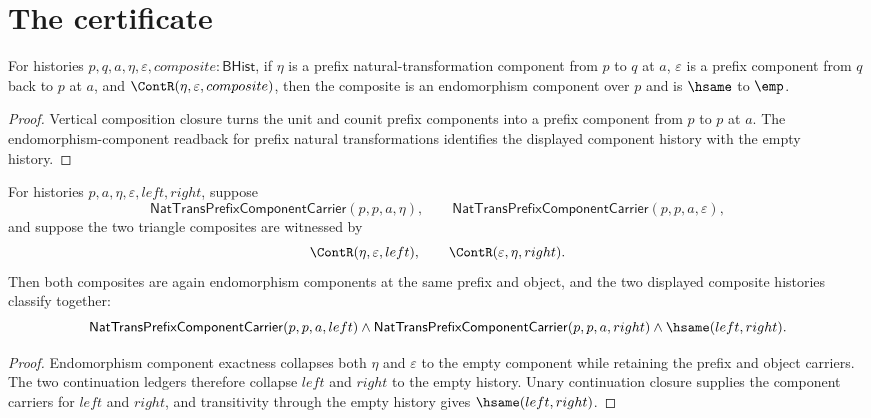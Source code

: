 \section{The certificate}
\label{sec:adjunction-certificate}

\begin{theorem}
\label{thm:adjunction-prefix-unit-counit-composite-empty}
For histories $p,q,a,\eta,\varepsilon,composite:\mathsf{BHist}$, if
$\eta$ is a prefix natural-transformation component from $p$ to $q$ at $a$,
$\varepsilon$ is a prefix component from $q$ back to $p$ at $a$, and
$\ContR(\eta,\varepsilon,composite)$, then the composite is an endomorphism
component over $p$ and is $\hsame$ to $\emp$.
\end{theorem}
\begin{proof}
Vertical composition closure turns the unit and counit prefix components into
a prefix component from $p$ to $p$ at $a$. The endomorphism-component readback
for prefix natural transformations identifies the displayed component history
with the empty history.
\end{proof}

\begin{theorem}
\label{thm:adjunction-prefix-endomorphism-triangle-component-closed}
For histories $p,a,\eta,\varepsilon,left,right$, suppose
$$
\mathsf{NatTransPrefixComponentCarrier}(p,p,a,\eta),
\qquad
\mathsf{NatTransPrefixComponentCarrier}(p,p,a,\varepsilon),
$$
and suppose the two triangle composites are witnessed by
$$
\ContR(\eta,\varepsilon,left),
\qquad
\ContR(\varepsilon,\eta,right).
$$
Then both composites are again endomorphism components at the same prefix and
object, and the two displayed composite histories classify together:
$$
\mathsf{NatTransPrefixComponentCarrier}(p,p,a,left)\land
\mathsf{NatTransPrefixComponentCarrier}(p,p,a,right)\land
\hsame(left,right).
$$
\end{theorem}
\begin{proof}
Endomorphism component exactness collapses both $\eta$ and $\varepsilon$ to the
empty component while retaining the prefix and object carriers. The two
continuation ledgers therefore collapse $left$ and $right$ to the empty history.
Unary continuation closure supplies the component carriers for $left$ and
$right$, and transitivity through the empty history gives $\hsame(left,right)$.
\end{proof}

